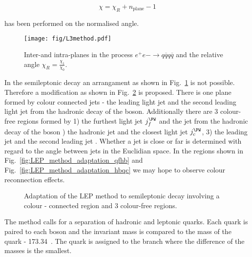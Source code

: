 \begin{equation}
  \chi=\chi_{R}+n_{\text{plane}}-1
\end{equation}

has been performed on the normalised angle. 

\begin{figure}[hbtp]
  \centering
  \texttt{[image: fig/L3method.pdf]}
  \caption{Inter-\PW and intra-\PW planes in the process $e^{+}e{-}\rightarrow q\overline{q}q\overline{q}$ and the relative angle $\chi_{R}=\frac{\chi_{1}}{\chi_{0}}$.}
  \label{fig:LEP_method}
\end{figure}

In the \ttbar semileptonic decay an arrangament as shown in Fig.~\ref{fig:LEP_method} is not possible. Therefore a modification as shown in Fig.~\ref{fig:LEP_method_adaptation} is proposed. There is one plane formed by colour connected jets - the leading light jet \leadingjet and the second leading light jet \scndleadingjet from the hadronic decay of the \PW boson. Additionally there are 3 colour-free regions formed by 1) the furthest light jet $j^{\PW}_{f}$ and the \cPqb jet from the hadronic decay of the \PW boson ) the hadronic \cPqb jet and the closest light jet $j^{\PW}_{c}$, 3) the leading \cPqb jet \leadingb and the second leading \cPqb jet \scndleadingb. Whether a jet is close or far is determined with regard to the angle between jets in the Euclidian space. In the regions shown in Fig.~\ref{fig:LEP_method_adaptation_qfhb} and Fig.~\ref{fig:LEP_method_adaptation_hbqc} we may hope to observe colour reconnection effects.

\begin{figure}[hbtp]
  \centering
  \def\twidth{0.24}
  \hfil
 \hfil
  \hfil
  \caption{Adaptation of the LEP method to \ttbar semileptonic decay involving a colour - connected region and 3 colour-free regions.}
  \label{fig:LEP_method_adaptation}
\end{figure}

The method calls for a separation of hadronic and leptonic \cPqb quarks. Each \cPqb quark is paired to each \PW boson and the invariant mass is compared to the mass of the \cPqt quark - 173.34~\GeV. The \cPqb quark is assigned to the branch where the difference of the masses is the smallest. 


